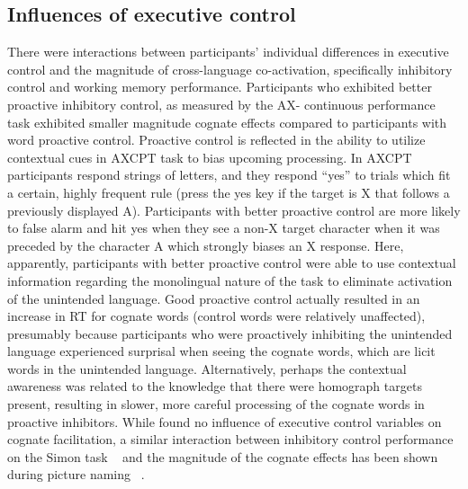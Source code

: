 \subsection{Influences of executive control}
\label{influencesofexecutivecontrol}

There were interactions between participants' individual differences in executive control and the magnitude of cross-language co-activation, specifically inhibitory control and working memory performance. Participants who exhibited better proactive inhibitory control, as measured by the AX- continuous performance task exhibited smaller magnitude cognate effects compared to participants with word proactive control. Proactive control is reflected in the ability to utilize contextual cues in AXCPT task to bias upcoming processing. In AXCPT participants respond strings of letters, and they respond ``yes'' to trials which fit a certain, highly frequent rule (press the yes key if the target is X that follows a previously displayed A). Participants with better proactive control are more likely to false alarm and hit yes when they see a non-X target character when it was preceded by the character A which strongly biases an X response. Here, apparently, participants with better proactive control were able to use contextual information regarding the monolingual nature of the task to eliminate activation of the unintended language. Good proactive control actually resulted in an increase in RT for cognate words (control words were relatively unaffected), presumably because participants who were proactively inhibiting the unintended language experienced surprisal when seeing the cognate words, which are licit words in the unintended language. Alternatively, perhaps the contextual awareness was related to the knowledge that there were homograph targets present, resulting in slower, more careful processing of the cognate words in proactive inhibitors. While  \citet{Pivneva2014} found no influence of executive control variables on cognate facilitation, a similar interaction between inhibitory control performance on the Simon task ~\citep{Simon1967} and the magnitude of the cognate effects has been shown during picture naming ~\citep{Linck2009}.

